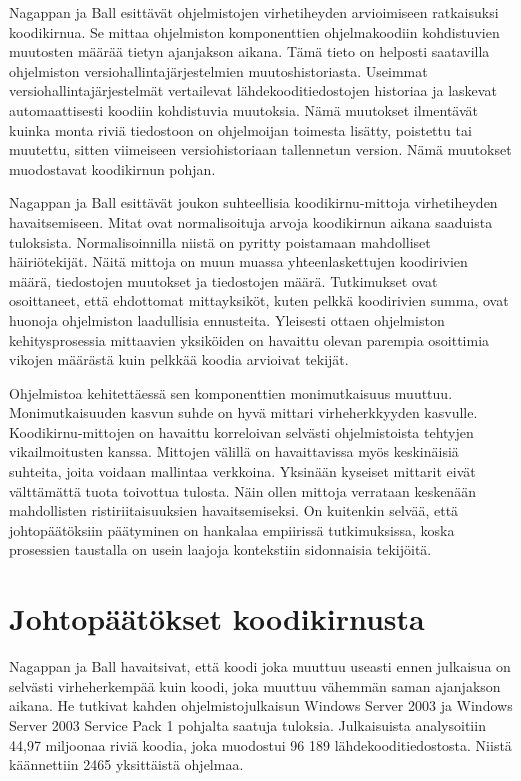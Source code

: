 \documentclass[finnish]{../tktltiki2}
\theoremstyle{definition}
\theoremstyle{remark}
\begin{document}
Nagappan ja Ball esittävät ohjelmistojen virhetiheyden arvioimiseen ratkaisuksi koodikirnua. Se mittaa ohjelmiston komponenttien ohjelmakoodiin kohdistuvien muutosten määrää tietyn ajanjakson aikana. Tämä tieto on helposti saatavilla ohjelmiston versiohallintajärjestelmien muutoshistoriasta. Useimmat versiohallintajärjestelmät vertailevat lähdekooditiedostojen historiaa ja laskevat automaattisesti koodiin kohdistuvia muutoksia. Nämä muutokset ilmentävät kuinka monta riviä tiedostoon on ohjelmoijan toimesta lisätty, poistettu tai muutettu, sitten viimeiseen versiohistoriaan tallennetun version. Nämä muutokset muodostavat koodikirnun pohjan.

Nagappan ja Ball esittävät joukon suhteellisia koodikirnu-mittoja virhetiheyden havaitsemiseen. Mitat ovat normalisoituja arvoja koodikirnun aikana saaduista tuloksista. Normalisoinnilla niistä on pyritty poistamaan mahdolliset häiriötekijät. Näitä mittoja on muun muassa yhteenlaskettujen koodirivien määrä, tiedostojen muutokset ja tiedostojen määrä. Tutkimukset ovat osoittaneet, että ehdottomat mittayksiköt, kuten pelkkä koodirivien summa, ovat huonoja ohjelmiston laadullisia ennusteita. Yleisesti ottaen ohjelmiston kehitysprosessia mittaavien yksiköiden on havaittu olevan parempia osoittimia vikojen määrästä kuin pelkkää koodia arvioivat tekijät.

Ohjelmistoa kehitettäessä sen komponenttien monimutkaisuus muuttuu. Monimutkaisuuden kasvun suhde on hyvä mittari virheherkkyyden kasvulle. Koodikirnu-mittojen on havaittu korreloivan selvästi ohjelmistoista tehtyjen vikailmoitusten kanssa. Mittojen välillä on havaittavissa myös keskinäisiä suhteita, joita voidaan mallintaa verkkoina. Yksinään kyseiset mittarit eivät välttämättä tuota toivottua tulosta. Näin ollen mittoja verrataan keskenään mahdollisten ristiriitaisuuksien havaitsemiseksi. On kuitenkin selvää, että johtopäätöksiin päätyminen on hankalaa empiirissä tutkimuksissa, koska prosessien taustalla on usein laajoja kontekstiin sidonnaisia tekijöitä.

\section{Johtopäätökset koodikirnusta}

Nagappan ja Ball havaitsivat, että koodi joka muuttuu useasti ennen julkaisua on selvästi virheherkempää kuin koodi, joka muuttuu vähemmän saman ajanjakson aikana. He tutkivat kahden ohjelmistojulkaisun Windows Server 2003 ja Windows Server 2003 Service Pack 1 pohjalta saatuja tuloksia. Julkaisuista analysoitiin 44,97 miljoonaa riviä koodia, joka muodostui 96 189 lähdekooditiedostosta. Niistä käännettiin 2465 yksittäistä ohjelmaa.\newline
\end{document}
